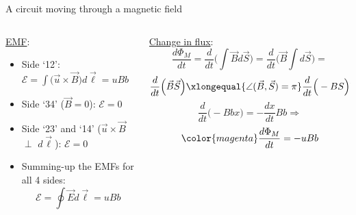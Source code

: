 \begin{frame}{A circuit moving through a magnetic field}
\begin{columns}[t]
  \begin{column}{0.50\textwidth}
  {\scriptsize
    \underline{EMF}:\\
    \vspace{0.1cm}
    \begin{itemize}
       \item Side `12':
             $\mathcal{E} = \int \Big( \vec{u} \times \vec{B} \Big) d\vec{\ell} = uBb$
       \item Side `34' ($\vec{B}=0$):
             $\mathcal{E} = 0$
       \item Side `23' and `14' ($\vec{u} \times \vec{B}$ $\perp$ $d\vec{\ell}$):
             $\mathcal{E} = 0$
       \item Summing-up the EMFs for all 4 sides:
            {\color{magenta}
              \begin{equation*}
               \mathcal{E} = \oint \vec{E} d\vec{\ell} = uBb
              \end{equation*}
            }
    \end{itemize}
  }
  \end{column}
  \begin{column}{0.50\textwidth}
  {\scriptsize
    \underline{Change in flux}:\\
    \begin{equation*}
      \frac{d\Phi_{M}}{dt} =
        \frac{d}{dt} \Big( \int \vec{B} d\vec{S} \Big) =
        \frac{d}{dt} \Big( \vec{B} \int d\vec{S} \Big) =
    \end{equation*}
    \begin{equation*}
          \frac{d}{dt} \Big( \vec{B} \vec{S} \Big) \xlongequal{\angle(\vec{B}, \vec{S}) = \pi}
          \frac{d}{dt} \Big( -BS \Big) \xlongequal{S=bx}
    \end{equation*}
    \begin{equation*}
        \frac{d}{dt} \Big( -Bbx \Big) =
        - \frac{dx}{dt} B b \Rightarrow
    \end{equation*}
    \begin{equation*}
        {\color{magenta}
          \frac{d\Phi_{M}}{dt} = -uBb
        }
    \end{equation*}
  }
  \end{column}
\end{columns}

\end{frame}

%
%
%

